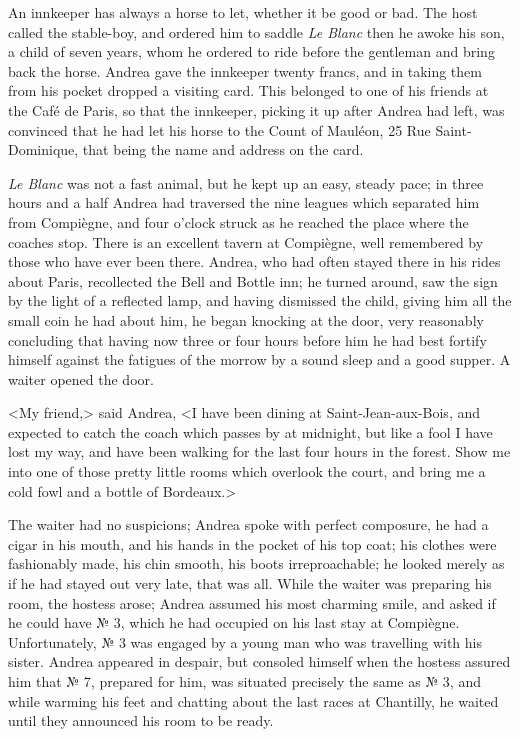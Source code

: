  An innkeeper has always a horse to let, whether it be good or bad. The host called the stable-boy, and ordered him to saddle \textit{Le Blanc} then he awoke his son, a child of seven years, whom he ordered to ride before the gentleman and bring back the horse. Andrea gave the innkeeper twenty francs, and in taking them from his pocket dropped a visiting card. This belonged to one of his friends at the Café de Paris, so that the innkeeper, picking it up after Andrea had left, was convinced that he had let his horse to the Count of Mauléon, 25 Rue Saint-Dominique, that being the name and address on the card. 

 \textit{Le Blanc} was not a fast animal, but he kept up an easy, steady pace; in three hours and a half Andrea had traversed the nine leagues which separated him from Compiègne, and four o'clock struck as he reached the place where the coaches stop. There is an excellent tavern at Compiègne, well remembered by those who have ever been there. Andrea, who had often stayed there in his rides about Paris, recollected the Bell and Bottle inn; he turned around, saw the sign by the light of a reflected lamp, and having dismissed the child, giving him all the small coin he had about him, he began knocking at the door, very reasonably concluding that having now three or four hours before him he had best fortify himself against the fatigues of the morrow by a sound sleep and a good supper. A waiter opened the door. 

 <My friend,> said Andrea, <I have been dining at Saint-Jean-aux-Bois, and expected to catch the coach which passes by at midnight, but like a fool I have lost my way, and have been walking for the last four hours in the forest. Show me into one of those pretty little rooms which overlook the court, and bring me a cold fowl and a bottle of Bordeaux.> 

 The waiter had no suspicions; Andrea spoke with perfect composure, he had a cigar in his mouth, and his hands in the pocket of his top coat; his clothes were fashionably made, his chin smooth, his boots irreproachable; he looked merely as if he had stayed out very late, that was all. While the waiter was preparing his room, the hostess arose; Andrea assumed his most charming smile, and asked if he could have № 3, which he had occupied on his last stay at Compiègne. Unfortunately, № 3 was engaged by a young man who was travelling with his sister. Andrea appeared in despair, but consoled himself when the hostess assured him that № 7, prepared for him, was situated precisely the same as № 3, and while warming his feet and chatting about the last races at Chantilly, he waited until they announced his room to be ready. 

